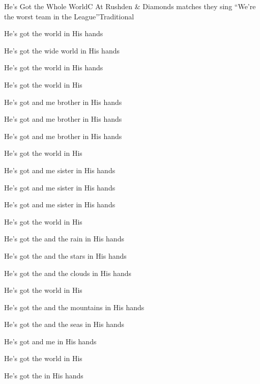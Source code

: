 \begin{SBSong}{He's Got the Whole World}{C}
    {At Rushden \& Diamonds matches they sing ``We're the worst team in the League''}{Traditional}
  \begin{SBVerse}
    He's got the  world in His hands
    
    He's got the  wide world in His hands

    He's got the  world in His hands

    He's got the  world in His 
  \end{SBVerse}
  \begin{SBVerse}
    He's got  and me brother in His hands

    He's got  and me brother in His hands

    He's got  and me brother in His hands

    He's got the  world in His 
  \end{SBVerse}
  \begin{SBVerse}
    He's got  and me sister in His hands

    He's got  and me sister in His hands

    He's got  and me sister in His hands

    He's got the  world in His 
  \end{SBVerse}
  \begin{SBVerse}
    He's got the  and the rain in His hands

    He's got the  and the stars in His hands

    He's got the  and the clouds in His hands

    He's got the  world in His 
  \end{SBVerse}
  \begin{SBVerse}
    He's got the  and the mountains in His hands

    He's got the  and the seas in His hands

    He's got  and me in His hands

    He's got the  world in His 
  \end{SBVerse}
  \begin{SBVerse}
    He's got the  in His hands


\end{SBVerse}
\end{SBSong}
